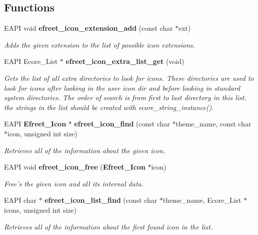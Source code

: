 \subsection*{Functions}
\begin{CompactItemize}
\item 
EAPI void {\bf efreet\_\-icon\_\-extension\_\-add} (const char $\ast$ext)
\begin{CompactList}\small\item\em Adds the given extension to the list of possible icon extensions. \item\end{CompactList}\item 
EAPI Ecore\_\-List $\ast$ {\bf efreet\_\-icon\_\-extra\_\-list\_\-get} (void)
\begin{CompactList}\small\item\em Gets the list of all extra directories to look for icons. These directories are used to look for icons after looking in the user icon dir and before looking in standard system directories. The order of search is from first to last directory in this list. the strings in the list should be created with ecore\_\-string\_\-instance(). \item\end{CompactList}\item 
EAPI {\bf Efreet\_\-Icon} $\ast$ {\bf efreet\_\-icon\_\-find} (const char $\ast$theme\_\-name, const char $\ast$icon, unsigned int size)
\begin{CompactList}\small\item\em Retrieves all of the information about the given icon. \item\end{CompactList}\item 
EAPI void {\bf efreet\_\-icon\_\-free} ({\bf Efreet\_\-Icon} $\ast$icon)
\begin{CompactList}\small\item\em Free's the given icon and all its internal data. \item\end{CompactList}\item 
EAPI char $\ast$ {\bf efreet\_\-icon\_\-list\_\-find} (const char $\ast$theme\_\-name, Ecore\_\-List $\ast$icons, unsigned int size)
\begin{CompactList}\small\item\em Retrieves all of the information about the first found icon in the list. \item\end{CompactList}\item 

\end{CompactItemize}
